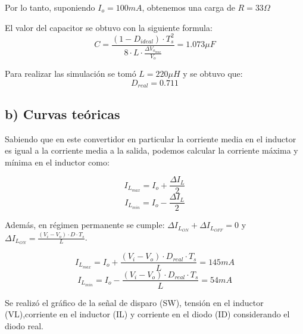 \documentclass[e4_tp1_main.tex]{subfiles}
\begin{document}


Por lo tanto, suponiendo $I_o=100mA$, obtenemos una carga de $R=33\Omega$



El valor del capacitor se obtuvo con la siguiente formula:
$$C=\frac{(1-D_{ideal}) \cdot T_{s}^{2}}{8\cdot L\cdot \frac{\Delta V_{o_{max}}}{V_o}}=1.073\mu F$$

Para realizar las simulaci\'on se tom\'o  $L=220\mu H$ y se obtuvo que: 
$$D_{real}=0.711$$


\subsection*{b) Curvas teóricas}

Sabiendo que en este convertidor en particular la corriente media en el inductor es igual a la corriente media a la salida, podemos calcular la corriente m\'axima y m\'inima en el inductor como:

$$I_{L_{max}}= I_o + \frac{\Delta I_L}{2}$$
$$I_{L_{min}}= I_o - \frac{\Delta I_L}{2}$$

Adem\'as, en r\'egimen permanente se cumple: $\Delta I_{L_{ON}}+\Delta I_{L_{OFF}}=0$ y $\Delta I_{L_{ON}}=\frac{(V_i-V_o)\cdot D\cdot T_s}{L}$.

$$I_{L_{max}}= I_o + \frac{(V_i-V_o)\cdot D_{real}\cdot T_s}{L}=145mA$$
$$I_{L_{min}}= I_o - \frac{(V_i-V_o)\cdot D_{real}\cdot T_s}{L}=54mA$$


Se realiz\'o el gr\'afico de la señal de disparo (SW), tensión en el inductor (VL),corriente en el inductor (IL) y corriente en el diodo (ID) considerando el diodo real. 
\end{document}
